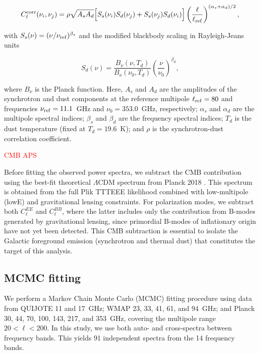 \begin{equation}
\begin{split}
C_\ell^{\rm corr}(\nu_i, \nu_j) = \rho \sqrt{A_s A_d} \Big[ S_s(\nu_i) S_d(\nu_j) + S_s(\nu_j) S_d(\nu_i) \Big] \left(\frac{\ell}{\ell_{\rm ref}}\right)^{(\alpha_s + \alpha_d)/2},
\end{split}
\end{equation}

with $S_s(\nu) = (\nu / \nu_{\rm ref})^{\beta_s}$ and the modified blackbody scaling in Rayleigh-Jeans units

\begin{equation}
S_d(\nu) = \frac{B_\nu(\nu, T_d)}{B_\nu(\nu_0, T_d)} \left(\frac{\nu}{\nu_0}\right)^{\beta_d},
\end{equation}

where $B_\nu$ is the Planck function. Here, $A_s$ and $A_d$ are the amplitudes of the synchrotron and dust components at the reference multipole $\ell_{\rm ref} = 80$ and frequencies $\nu_{\rm ref} = 11.1$~GHz and $\nu_0 = 353.0$~GHz, respectively; $\alpha_s$ and $\alpha_d$ are the multipole spectral indices; $\beta_s$ and $\beta_d$ are the frequency spectral indices; $T_d$ is the dust temperature (fixed at $T_d = 19.6$~K); and $\rho$ is the synchrotron-dust correlation coefficient.

\textcolor{red}{CMB APS}

Before fitting the observed power spectra, we subtract the CMB contribution using the best-fit theoretical $\Lambda$CDM spectrum from Planck 2018 \citep{Planck_2018vi}. This spectrum is obtained from the full Plik TTTEEE likelihood combined with low-multipole (lowE) and gravitational lensing constraints. For polarization modes, we subtract both $C_\ell^{EE}$ and $C_\ell^{BB}$, where the latter includes only the contribution from B-modes generated by gravitational lensing, since primordial B-modes of inflationary origin have not yet been detected. This CMB subtraction is essential to isolate the Galactic foreground emission (synchrotron and thermal dust) that constitutes the target of this analysis.

\subsection{MCMC fitting}
\label{sec:mcmc}


We perform a Markov Chain Monte Carlo (MCMC) fitting procedure using data from QUIJOTE 11 and 17~GHz; WMAP 23, 33, 41, 61, and 94~GHz; and Planck 30, 44, 70, 100, 143, 217, and 353~GHz, covering the multipole range $20 < \ell < 200$. In this study, we use both auto- and cross-spectra between frequency bands. This yields 91 independent spectra from the 14 frequency bands.

